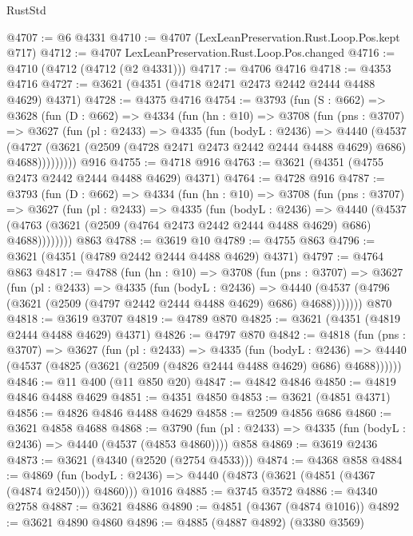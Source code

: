 \begin{lexlean}{RustStd}
\begin{coremodule}
@4707 := @6 @4331
@4710 := @4707 (LexLeanPreservation.Rust.Loop.Pos.kept @717)
@4712 := @4707 LexLeanPreservation.Rust.Loop.Pos.changed
@4716 := @4710 (@4712 (@4712 (@2 @4331)))
@4717 := @4706 @4716
@4718 := @4353 @4716
@4727 := @3621 (@4351 (@4718 @2471 @2473 @2442 @2444 @4488 @4629) @4371)
@4728 := @4375 @4716
@4754 := @3793
    (fun (S : @662) =>
    @3628
      (fun (D : @662) =>
      @4334
        (fun (hn : @10) =>
        @3708
          (fun (pns : @3707) =>
          @3627
            (fun (pl : @2433) =>
            @4335
              (fun (bodyL : @2436) =>
              @4440
                (@4537
                  (@4727
                    (@3621 (@2509 (@4728 @2471 @2473 @2442 @2444 @4488 @4629) @686) @4688)))))))))
    @916
@4755 := @4718 @916
@4763 := @3621 (@4351 (@4755 @2473 @2442 @2444 @4488 @4629) @4371)
@4764 := @4728 @916
@4787 := @3793
    (fun (D : @662) =>
    @4334
      (fun (hn : @10) =>
      @3708
        (fun (pns : @3707) =>
        @3627
          (fun (pl : @2433) =>
          @4335
            (fun (bodyL : @2436) =>
            @4440
              (@4537 (@4763 (@3621 (@2509 (@4764 @2473 @2442 @2444 @4488 @4629) @686) @4688))))))))
    @863
@4788 := @3619 @10
@4789 := @4755 @863
@4796 := @3621 (@4351 (@4789 @2442 @2444 @4488 @4629) @4371)
@4797 := @4764 @863
@4817 := @4788
    (fun (hn : @10) =>
    @3708
      (fun (pns : @3707) =>
      @3627
        (fun (pl : @2433) =>
        @4335
          (fun (bodyL : @2436) =>
          @4440 (@4537 (@4796 (@3621 (@2509 (@4797 @2442 @2444 @4488 @4629) @686) @4688)))))))
    @870
@4818 := @3619 @3707
@4819 := @4789 @870
@4825 := @3621 (@4351 (@4819 @2444 @4488 @4629) @4371)
@4826 := @4797 @870
@4842 := @4818
    (fun (pns : @3707) =>
    @3627
      (fun (pl : @2433) =>
      @4335
        (fun (bodyL : @2436) =>
        @4440 (@4537 (@4825 (@3621 (@2509 (@4826 @2444 @4488 @4629) @686) @4688))))))
@4846 := @11 @400 (@11 @850 @20)
@4847 := @4842 @4846
@4850 := @4819 @4846 @4488 @4629
@4851 := @4351 @4850
@4853 := @3621 (@4851 @4371)
@4856 := @4826 @4846 @4488 @4629
@4858 := @2509 @4856 @686
@4860 := @3621 @4858 @4688
@4868 := @3790 (fun (pl : @2433) => @4335 (fun (bodyL : @2436) => @4440 (@4537 (@4853 @4860)))) @858
@4869 := @3619 @2436
@4873 := @3621 (@4340 (@2520 (@2754 @4533)))
@4874 := @4368 @858
@4884 := @4869
    (fun (bodyL : @2436) => @4440 (@4873 (@3621 (@4851 (@4367 (@4874 @2450))) @4860)))
    @1016
@4885 := @3745 @3572
@4886 := @4340 @2758
@4887 := @3621 @4886
@4890 := @4851 (@4367 (@4874 @1016))
@4892 := @3621 @4890 @4860
@4896 := @4885 (@4887 @4892) (@3380 @3569)

\end{coremodule}
\end{lexlean}
